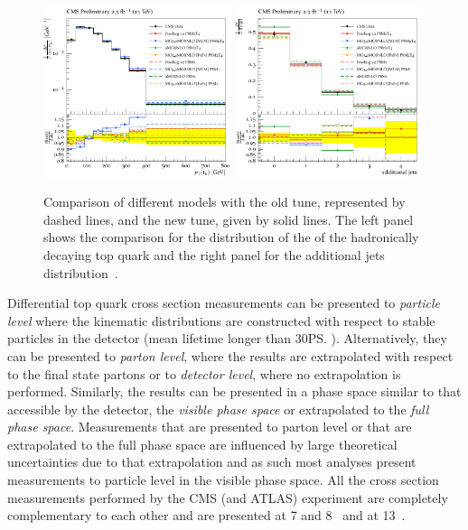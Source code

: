 \begin{figure}[htpb]
	\centering
	\includegraphics[width=0.49\textwidth]{Figures/TuningEx3}
	\includegraphics[width=0.49\textwidth]{Figures/TuningEx2}
	\caption[Comparison of different \ttbar{} models with the old \CUETold{} tune, represented by dashed lines, and the new \CUET{} tune, given by solid lines. The left panel shows the comparison for the distribution of the \pt{} of the hadronically decaying top quark and the right panel for the additional jets distribution.]{ Comparison of different \ttbar{} models with the old \CUETold{} tune, represented by dashed lines, and the new \CUET{} tune, given by solid lines. The left panel shows the comparison for the distribution of the \pt{} of the hadronically decaying top quark and the right panel for the additional jets distribution~\cite{Gen:CUETP8M2T4}. }
	\label{fig:8TeVTuning}
\end{figure}

Differential top quark cross section measurements can be presented to \textit{particle level} where the kinematic distributions are constructed with respect to stable particles in the detector (mean lifetime longer than 30\ps{}).
Alternatively, they can be presented to \textit{parton level}, where the results are extrapolated with respect to the final state partons or to \textit{detector level}, where no extrapolation is performed.
Similarly, the results can be presented in a phase space similar to that accessible by the detector, the \textit{visible phase space} or extrapolated to the \textit{full phase space}.
Measurements that are presented to parton level or that are extrapolated to the full phase space are influenced by large theoretical uncertainties due to that extrapolation and as such most analyses present measurements to particle level in the visible phase space.
All the \ttbar{} cross section measurements performed by the CMS (and ATLAS) experiment are completely complementary to each other and are presented at 7 and 8\TeV{}~\cite{TOP11013,TOP12028,TOP14012,TOP14013} and at 13\TeV~\cite{TOP15013, TOP16007,TOP16008,TOP16010,TOP17002}.

